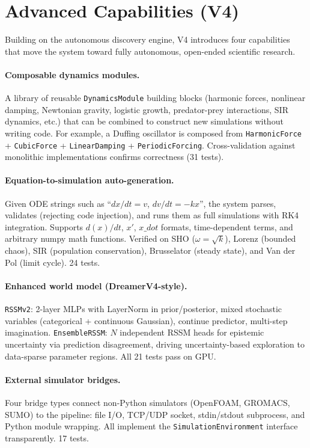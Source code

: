 \documentclass{article}
\begin{document}
\section{Advanced Capabilities (V4)}
\label{sec:v4}

Building on the autonomous discovery engine, V4 introduces four capabilities
that move the system toward fully autonomous, open-ended scientific research.

\paragraph{Composable dynamics modules.}
A library of reusable \texttt{DynamicsModule} building blocks (harmonic forces,
nonlinear damping, Newtonian gravity, logistic growth, predator-prey
interactions, SIR dynamics, etc.) that can be combined to construct new
simulations without writing code. For example, a Duffing oscillator is
composed from \texttt{HarmonicForce} + \texttt{CubicForce} +
\texttt{LinearDamping} + \texttt{PeriodicForcing}. Cross-validation against
monolithic implementations confirms correctness (31 tests).

\paragraph{Equation-to-simulation auto-generation.}
Given ODE strings such as ``$dx/dt = v$, $dv/dt = -kx$'', the system parses,
validates (rejecting code injection), and runs them as full simulations with
RK4 integration. Supports $d(x)/dt$, $x'$, $x\_dot$ formats, time-dependent
terms, and arbitrary numpy math functions. Verified on SHO ($\omega = \sqrt{k}$),
Lorenz (bounded chaos), SIR (population conservation), Brusselator (steady state),
and Van der Pol (limit cycle). 24 tests.

\paragraph{Enhanced world model (DreamerV4-style).}
\texttt{RSSMv2}: 2-layer MLPs with LayerNorm in prior/posterior, mixed
stochastic variables (categorical + continuous Gaussian), continue predictor,
multi-step imagination. \texttt{EnsembleRSSM}: $N$ independent RSSM heads
for epistemic uncertainty via prediction disagreement, driving uncertainty-based
exploration to data-sparse parameter regions. All 21 tests pass on GPU.

\paragraph{External simulator bridges.}
Four bridge types connect non-Python simulators (OpenFOAM, GROMACS, SUMO)
to the pipeline: file I/O, TCP/UDP socket, stdin/stdout subprocess, and
Python module wrapping. All implement the \texttt{SimulationEnvironment}
interface transparently. 17 tests.
\end{document}
